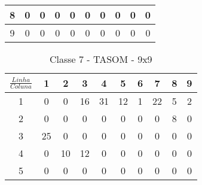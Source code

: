 \begin{table}[]
\begin{tabular}{|c|c|c|c|c|c|c|c|c|c|}
\rowcolor[HTML]{FFFFFF} 
8                         & 0                         & 0                         & 0                         & 0                         & 0  & 0                          & 0                          & 0                          & 0                         \\ \hline
\rowcolor[HTML]{FFFFFF} 
9                         & 0                         & 0                         & 0                         & 0                         & 0  & 0                          & 0                          & 0                          & 0                         \\ \hline
\end{tabular}
\end{table}



\begin{table}[]
\centering
\caption{Classe 7 - TASOM - 9x9}
\label{my-label}
\begin{tabular}{|c|c|c|c|c|c|c|c|c|c|}
\hline
\rowcolor[HTML]{FFFFFF} 
$\frac{Linha}{Coluna}$    & 1                          & 2                          & 3                          & 4  & 5  & 6                          & 7  & 8                         & 9 \\ \hline
\rowcolor[HTML]{34CDF9} 
\cellcolor[HTML]{FFFFFF}1 & \cellcolor[HTML]{FFFFFF}0  & \cellcolor[HTML]{FFFFFF}0  & 16                         & 31 & 12 & 1                          & 22 & 5                         & 2 \\ \hline
\rowcolor[HTML]{FFFFFF} 
2                         & 0                          & 0                          & 0                          & 0  & 0  & 0                          & 0  & \cellcolor[HTML]{34CDF9}8 & 0 \\ \hline
\rowcolor[HTML]{FFFFFF} 
3                         & \cellcolor[HTML]{34CDF9}25 & 0                          & 0                          & 0  & 0  & 0                          & 0  & 0                         & 0 \\ \hline
\rowcolor[HTML]{FFFFFF} 
4                         & 0                          & \cellcolor[HTML]{34CDF9}10 & \cellcolor[HTML]{34CDF9}12 & 0  & 0  & 0                          & 0  & 0                         & 0 \\ \hline
\rowcolor[HTML]{FFFFFF} 
5                         & 0                          & 0                          & 0                          & 0  & 0  & 0                          & 0  & 0                         & 0 \\ \hline

\end{tabular}
\end{table}
